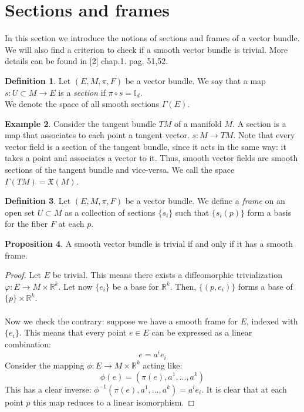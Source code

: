 \documentclass[12pt,a4paper]{report}
\theoremstyle{definition}
\newtheorem{Def}{Definition}[chapter]
\theoremstyle{Theorem}
\newtheorem{Prop}[Def]{Proposition}
\theoremstyle{definition}
\newtheorem{Ex}[Def]{Example}
\theoremstyle{definition}
\begin{document}
		\section{Sections and frames}
			In this section we introduce the notions of sections and frames of a vector bundle. We will also find a criterion to check if a smooth vector bundle is trivial. More details can be found in [2] chap.1. pag. 51,52.
		\begin{Def}\label{Def_5.5}
			Let $(E,M,\pi,F)$ be a vector bundle. We say that a map \\$s:U\subset M\rightarrow E$ is a \textit{section} if $\pi\circ s=\mathbb{I}_d$. \\
			We denote the space of all smooth sections $\Gamma(E)$.
		\end{Def}
		\begin{Ex}
			Consider the tangent bundle $TM$ of a manifold $M$. A section is a map that associates to each point a tangent vector. $s:M\rightarrow TM$. Note that every vector field is a section of the tangent bundle, since it acts in the same way: it takes a point and associates a vector to it. Thus, smooth vector fields are smooth sections of the tangent bundle and vice-versa. We call the space $\Gamma(TM)=\mathfrak{X}(M)$.
		\end{Ex}
		\begin{Def}\label{Def_5.6}
			Let $(E,M,\pi,F)$ be a vector bundle. We define a \textit{frame} on an open set $U\subset M$ as a collection of sections $\{s_i\}$ such that $\{s_i(p)\}$ form a basis for the fiber $F$ at each $p$. 
		\end{Def}
		\begin{Prop}\label{prop_2.3.1}
			A smooth vector bundle is trivial if and only if it has a smooth frame.
		\end{Prop}
		\begin{proof}
			Let $E$ be trivial. This means there exists a diffeomorphic trivialization $\varphi:E\rightarrow M\times \mathbb{R}^k$. Let now $\{e_i\}$ be a base for $\mathbb{R}^k$. Then, $\{(p,e_i)\}$ forms a base of $\{p\}\times \mathbb{R}^k$.
			\\\\
			Now we check the contrary: suppose we have a smooth frame for $E$, indexed with $\{e_i\}$. This means that every point $e\in E$ can be expressed as a linear combination:
			$$e=a^ie_i$$
			Consider the mapping $\phi:E\rightarrow M\times\mathbb{R}^k$ acting like:
			$$\phi(e)=(\pi(e),a^1,...,a^k)$$
			This has a clear inverse: $\phi^{-1}(\pi(e),a^1,...,a^k)=a^ie_i$.
			It is clear that at each point $p$ this map reduces to a linear isomorphism.
		\end{proof}
\end{document}
